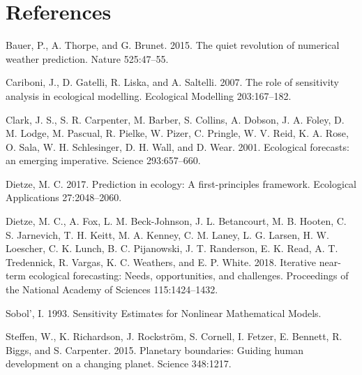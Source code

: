 \documentclass[12pt,]{article}
\begin{document}
\hypertarget{references}{%
\section*{References}\label{references}}

\hypertarget{refs}{}
\leavevmode\hypertarget{ref-Bauer2015}{}%
Bauer, P., A. Thorpe, and G. Brunet. 2015. The quiet revolution of
numerical weather prediction. Nature 525:47--55.

\leavevmode\hypertarget{ref-Cariboni2007}{}%
Cariboni, J., D. Gatelli, R. Liska, and A. Saltelli. 2007. The role of
sensitivity analysis in ecological modelling. Ecological Modelling
203:167--182.

\leavevmode\hypertarget{ref-Clark2001}{}%
Clark, J. S., S. R. Carpenter, M. Barber, S. Collins, A. Dobson, J. A.
Foley, D. M. Lodge, M. Pascual, R. Pielke, W. Pizer, C. Pringle, W. V.
Reid, K. A. Rose, O. Sala, W. H. Schlesinger, D. H. Wall, and D. Wear.
2001. Ecological forecasts: an emerging imperative. Science
293:657--660.

\leavevmode\hypertarget{ref-Dietze2017a}{}%
Dietze, M. C. 2017. Prediction in ecology: A first-principles framework.
Ecological Applications 27:2048--2060.

\leavevmode\hypertarget{ref-Dietze2018}{}%
Dietze, M. C., A. Fox, L. M. Beck-Johnson, J. L. Betancourt, M. B.
Hooten, C. S. Jarnevich, T. H. Keitt, M. A. Kenney, C. M. Laney, L. G.
Larsen, H. W. Loescher, C. K. Lunch, B. C. Pijanowski, J. T. Randerson,
E. K. Read, A. T. Tredennick, R. Vargas, K. C. Weathers, and E. P.
White. 2018. Iterative near-term ecological forecasting: Needs,
opportunities, and challenges. Proceedings of the National Academy of
Sciences 115:1424--1432.

\leavevmode\hypertarget{ref-Sobol1993}{}%
Sobol', I. 1993. Sensitivity Estimates for Nonlinear Mathematical
Models.

\leavevmode\hypertarget{ref-Steffen2015}{}%
Steffen, W., K. Richardson, J. Rockström, S. Cornell, I. Fetzer, E.
Bennett, R. Biggs, and S. Carpenter. 2015. Planetary boundaries: Guiding
human development on a changing planet. Science 348:1217.
\end{document}
